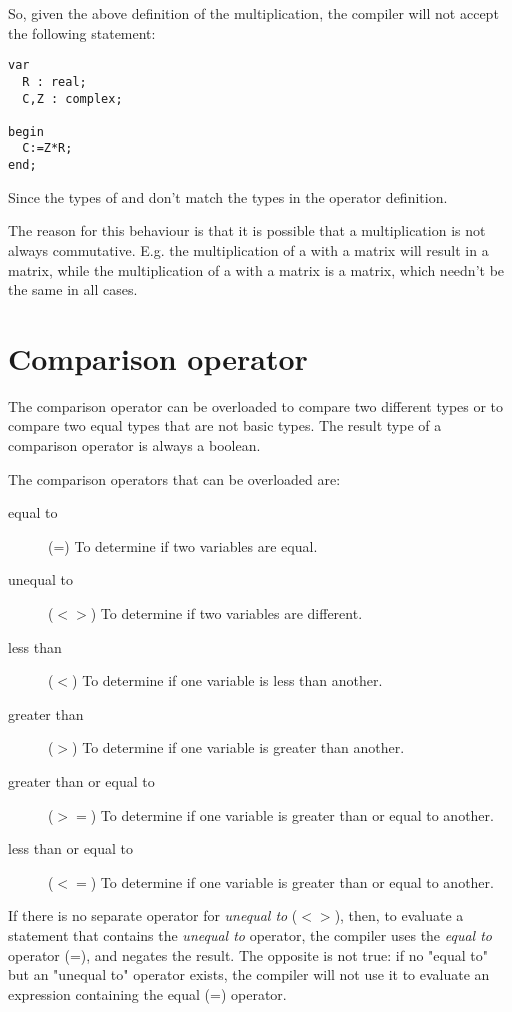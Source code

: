 So, given the above definition of the multiplication,
the compiler will not accept the following statement:
\begin{verbatim}
var
  R : real;
  C,Z : complex;

begin
  C:=Z*R;
end;
\end{verbatim}
Since the types of  and  don't match the types in the
operator definition.

The reason for this behaviour is that it is possible that a multiplication
is not always commutative. E.g. the multiplication of a  with a
 matrix will result in a  matrix, while the
multiplication of a  with a  matrix is a 
matrix, which needn't be the same in all cases.

\section{Comparison operator}
The comparison operator can be overloaded to compare two different types
or to compare two equal types that are not basic types. The result type of
a comparison operator is always a boolean.

The comparison operators that can be overloaded are:
\begin{description}
\item[equal to] (=) To determine if two variables are equal.
\item[unequal to] ($<>$) To determine if two variables are different.
\item[less than] ($<$) To determine if one variable is less than another.
\item[greater than] ($>$) To determine if one variable is greater than another.
\item[greater than or equal to] ($>=$) To determine if one variable is greater than
or equal to another.
\item[less than or equal to] ($<=$) To determine if one variable is greater
than or equal to another.
\end{description}

If there is no separate operator for {\em unequal to} ($<>$), then, to evaluate a
statement that contains the {\em unequal to} operator, the compiler uses the
{\em equal to} operator (=), and negates the result. The opposite is not
true: if no "equal to" but an "unequal to" operator exists, the compiler
will not use it to evaluate an expression containing the equal (=) operator. 

